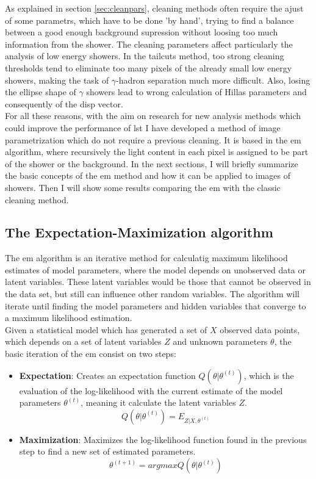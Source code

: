 \documentclass[main.tex]{subfiles}
\begin{document}
As explained in section \ref{sec:cleanpars}, cleaning methods often require the ajust of some parametrs, which have to be done 'by hand', trying to find a balance between a good enough background supression without loosing too much information from the shower. The cleaning parameters affect particularly the analysis of low energy showers. In the tailcuts method, too strong cleaning thresholds tend to eliminate too many pixels of the already small low energy showers, making the task of $\gamma$-hadron separation much more difficult. Also, losing the ellipse shape of $\gamma$ showers lead to wrong calculation of Hillas parameters and consequently of the disp vector.\\
For all these reasons, with the aim on research for new analysis methods which could improve the performance of \gls{lst} I have developed a method of image parametrization which do not require a previous cleaning. It is based in the \gls{em} algorithm, where recursively the light content in each pixel is assigned to be part of the shower or the background. In the next sections, I will briefly summarize the basic concepts of the \gls{em} method and how it can be applied to images of showers. Then I will show some results comparing the \gls{em} with the classic cleaning method. 

\subsection{The Expectation-Maximization algorithm}

The \gls{em} algorithm \cite{1977EM} is an iterative method for calculatig maximum likelihood estimates of model parameters, where the model depends on unobserved data or latent variables. These latent variables would be those that cannot be observed in the data set, but still can influence other random variables. The algorithm will iterate until finding the model parameters and hidden variables that converge to a maximum likelihood estimation.\\
Given a statistical model which has generated a set of $X$ observed data points, which depends on a set of latent variables $Z$ and unknown parameters $\theta$, the basic iteration of the \gls{em} consist on two steps:

\begin{itemize}
\item \textbf{Expectation}: Creates an expectation function $Q(\theta | \theta^{(t)})$, which is the evaluation of the log-likelihood with the current estimate of the model parameters $\theta^{(t)}$, meaning it calculate the latent variables $Z$.
  \begin{equation}
    Q(\theta | \theta^{(t)}) = E_{Z|X,\theta^(t)}
  \end{equation}
   
\item \textbf{Maximization}: Maximizes the log-likelihood function found in the previous step to find a new set of estimated parameters.
  \begin{equation}
    \theta^{(t+1)} = arg max Q(\theta | \theta^{(t)})
  \end{equation}  
\end{itemize}
\end{document}
